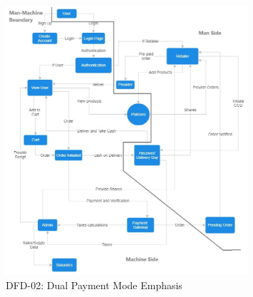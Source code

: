 \documentclass[a4paper,12pt]{article}
\begin{document}
\begin{figure}
    \centering
    \includegraphics[width=0.8\textwidth]{dfd2.jpg}
    \caption{DFD-02: Dual Payment Mode Emphasis}
\end{figure}
\end{document}
